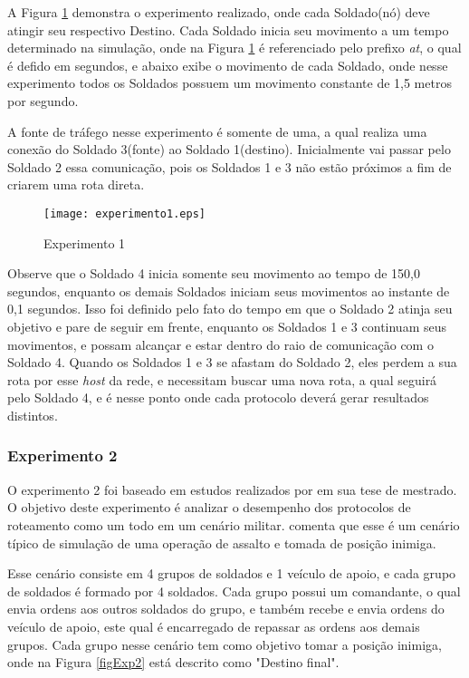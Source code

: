 A Figura \ref{figExp1} demonstra o experimento realizado, onde cada Soldado(n\'o) deve atingir seu respectivo Destino.
Cada Soldado inicia seu movimento a um tempo determinado na simula\c{c}\~ao, onde na Figura \ref{figExp1} \'e referenciado pelo prefixo \textit{at}, o qual \'e defido em segundos, e abaixo exibe o movimento de cada Soldado, onde nesse experimento todos os Soldados possuem um movimento constante de 1,5 metros por segundo. 

A fonte de tr\'afego nesse experimento \'e somente de uma, a qual realiza uma conex\~ao do Soldado 3(fonte) ao Soldado 1(destino). Inicialmente vai passar pelo Soldado 2 essa comunica\c{c}\~ao, pois os Soldados 1 e 3 n\~ao est\~ao pr\'oximos a fim de criarem uma rota direta.

\begin{figure}[H]
	\centering
	\texttt{[image: experimento1.eps]}
	\caption{Experimento 1}
	\label{figExp1}
\end{figure}

Observe que o Soldado 4 inicia somente seu movimento ao tempo de 150,0 segundos, enquanto os demais Soldados iniciam seus movimentos ao instante de 0,1 segundos.
Isso foi definido pelo fato do tempo em que o Soldado 2 atinja seu objetivo e pare de seguir em frente, enquanto os Soldados 1 e 3 continuam seus movimentos, e possam alcan\c{c}ar e estar dentro do raio de comunica\c{c}\~ao com o Soldado 4.
Quando os Soldados 1 e 3 se afastam do Soldado 2, eles perdem a sua rota por esse \textit{host} da rede, e necessitam buscar uma nova rota, a qual seguir\'a pelo Soldado 4, e \'e nesse ponto onde cada protocolo dever\'a gerar resultados distintos.

\subsubsection{Experimento 2}
O experimento 2 foi baseado em estudos realizados por \cite{pereira} em sua tese de mestrado. 
O objetivo deste experimento \'e analizar o desempenho dos protocolos de roteamento como um todo em um cen\'ario militar. 
\cite{pereira} comenta que esse \'e um cen\'ario t\'ipico de simula\c{c}\~ao de uma opera\c{c}\~ao de assalto e tomada de posi\c{c}\~ao inimiga.

Esse cen\'ario consiste em 4 grupos de soldados e 1 ve\'iculo de apoio, e cada grupo de soldados \'e formado por 4 soldados.
Cada grupo possui um comandante, o qual envia ordens aos outros soldados do grupo, e tamb\'em recebe e envia ordens do ve\'iculo de apoio, este qual \'e encarregado de repassar as ordens aos demais grupos.
Cada grupo nesse cen\'ario tem como objetivo tomar a posi\c{c}\~ao inimiga, onde na Figura \ref{figExp2} est\'a descrito como "Destino final".

